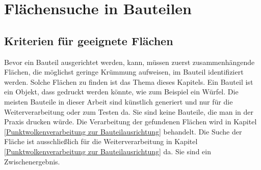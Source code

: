 
\chapter{Flächensuche in  Bauteilen}
\label{Flächensuche in  Bauteilen}

\section{Kriterien für geeignete Flächen}
\label{Kriterien für geeignete Flächen}

Bevor ein Bauteil ausgerichtet werden, kann, müssen zuerst zusammenhängende Flächen, die möglichst geringe Krümmung aufweisen, im Bauteil identifiziert werden. Solche Flächen zu finden ist das Thema dieses Kapitels. Ein Bauteil ist ein Objekt, dass gedruckt werden könnte, wie zum Beispiel ein Würfel. 
Die meisten Bauteile in dieser Arbeit sind künstlich generiert und nur für die Weiterverarbeitung oder zum Testen da. Sie sind keine Bauteile, die man in der Praxis drucken würde. Die Verarbeitung der gefundenen Flächen wird in Kapitel \ref{Punktwolkenverarbeitung zur Bauteilausrichtung} behandelt.
Die Suche der Fläche ist ausschließlich für die Weiterverarbeitung in Kapitel \ref{Punktwolkenverarbeitung zur Bauteilausrichtung} da. Sie sind ein Zwischenergebnis.

\smallskip

